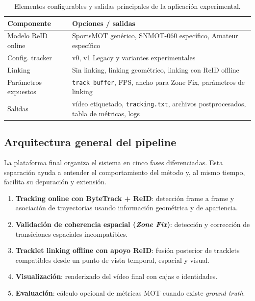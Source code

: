 \documentclass[../MAIN.tex]{subfiles}
\begin{document}
	\begin{table}[H]
		\centering
		\caption{Elementos configurables y salidas principales de la aplicación experimental.}
		\label{tab:cap12_app}
		\begin{tabular}{p{4.3cm}p{8.7cm}}
			\toprule
			\textbf{Componente} & \textbf{Opciones / salidas} \\
			\midrule
			Modelo ReID online & SportsMOT genérico, SNMOT-060 específico, Amateur específico \\
			Config. tracker & v0, v1 Legacy y variantes experimentales \\
			Linking & Sin linking, linking geométrico, linking con ReID offline \\
			Parámetros expuestos & \texttt{track\_buffer}, FPS, ancho para Zone Fix, parámetros de linking \\
			Salidas & vídeo etiquetado, \texttt{tracking.txt}, archivos postprocesados, tabla de métricas, logs \\
			\bottomrule
		\end{tabular}
	\end{table}
	
	\subsection{Arquitectura general del pipeline}
	
	La plataforma final organiza el sistema en cinco fases diferenciadas. Esta separación ayuda a entender el comportamiento del método y, al mismo tiempo, facilita su depuración y extensión.
	
	\begin{enumerate}
		\item \textbf{Tracking online con ByteTrack + ReID}: detección frame a frame y asociación de trayectorias usando información geométrica y de apariencia.
		\item \textbf{Validación de coherencia espacial (\textit{Zone Fix})}: detección y corrección de transiciones espaciales incompatibles.
		\item \textbf{Tracklet linking offline con apoyo ReID}: fusión posterior de tracklets compatibles desde un punto de vista temporal, espacial y visual.
		\item \textbf{Visualización}: renderizado del vídeo final con cajas e identidades.
		\item \textbf{Evaluación}: cálculo opcional de métricas MOT cuando existe \textit{ground truth}.
	\end{enumerate}
	
\end{document}
